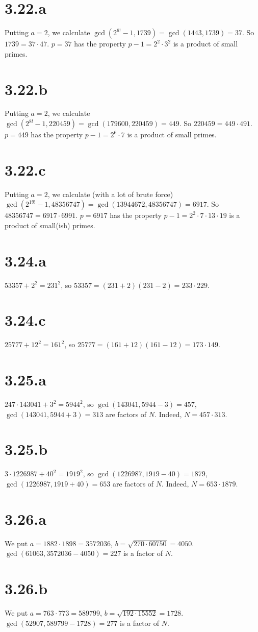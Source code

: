 \documentclass{article}
\begin{document}
\section*{3.22.a}
Putting $a = 2$, we calculate $\gcd(2^{6!} -1, 1739) = \gcd(1443,1739) = 37$. So $1739 = 37 \cdot 47$. $p = 37$ has the property $p-1 = 2^2 \cdot 3^2$ is a product of small primes.

\section*{3.22.b}
Putting $a = 2$, we calculate $\gcd(2^{8!}-1,220459) = \gcd(179600,220459) = 449$. So $220459 = 449 \cdot 491$. $p = 449$ has the property $p-1 = 2^6 \cdot 7$ is a product of small primes.

\section*{3.22.c}
Putting $a = 2$, we calculate (with a lot of brute force) $\gcd(2^{19!}-1,48356747) = \gcd(13944672,48356747) = 6917$. So $48356747 = 6917 \cdot 6991$. $p = 6917$ has the property $p-1 = 2^2 \cdot 7 \cdot 13 \cdot 19$ is a product of small(ish) primes.

\section*{3.24.a}
$53357 + 2^2 = 231^2$, so $53357 = (231+2)(231-2) = 233 \cdot 229$.

\section*{3.24.c}
$25777 + 12^2 = 161^2$, so $25777 = (161+12)(161-12) = 173 \cdot 149$.

\section*{3.25.a}
$247 \cdot 143041 + 3^2 = 5944^2$, so $\gcd(143041,5944-3) = 457$, $\gcd(143041,5944+3) = 313$ are factors of $N$. Indeed, $N = 457 \cdot 313$.

\section*{3.25.b}
$3 \cdot 1226987 + 40^2 = 1919^2$, so $\gcd(1226987, 1919-40) = 1879$, $\gcd(1226987, 1919+40) = 653$ are factors of $N$. Indeed, $N = 653 \cdot 1879$.

\section*{3.26.a}
We put $a = 1882 \cdot 1898 = 3572036$, $b = \sqrt{270 \cdot 60750} = 4050$. $\gcd(61063,3572036-4050) = 227$ is a factor of $N$.

\section*{3.26.b}
We put $a = 763 \cdot 773 = 589799$, $b = \sqrt{192 \cdot 15552} = 1728$. $\gcd(52907,589799-1728) = 277$ is a factor of $N$.
\end{document}
